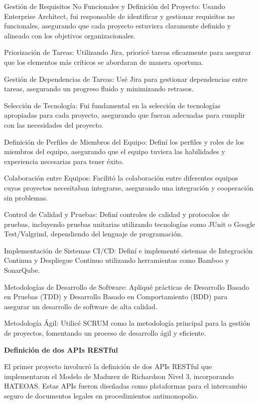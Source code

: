 \documentclass[a4paper,10pt]{article}
\newcommand{\cvsubsubsection}[1]{
\begin{tcolorbox}[colback=gray!10, colframe=gray!10, boxrule=0pt, arc=0mm, outer arc=0mm, width=\textwidth, boxsep=0pt, left=4mm, right=4mm, top=1mm, bottom=1mm]
  \textbf{#1}
\end{tcolorbox}
\vspace{1mm}
}
\begin{document}
Gestión de Requisitos No Funcionales y Definición del Proyecto: Usando Enterprise Architect, fui responsable de identificar y gestionar requisitos no funcionales, asegurando que cada proyecto estuviera claramente definido y alineado con los objetivos organizacionales.

Priorización de Tareas: Utilizando Jira, prioricé tareas eficazmente para asegurar que los elementos más críticos se abordaran de manera oportuna.

Gestión de Dependencias de Tareas: Usé Jira para gestionar dependencias entre tareas, asegurando un progreso fluido y minimizando retrasos.

Selección de Tecnología: Fui fundamental en la selección de tecnologías apropiadas para cada proyecto, asegurando que fueran adecuadas para cumplir con las necesidades del proyecto.

Definición de Perfiles de Miembros del Equipo: Definí los perfiles y roles de los miembros del equipo, asegurando que el equipo tuviera las habilidades y experiencia necesarias para tener éxito.

Colaboración entre Equipos: Facilitó la colaboración entre diferentes equipos cuyos proyectos necesitaban integrarse, asegurando una integración y cooperación sin problemas.

Control de Calidad y Pruebas: Definí controles de calidad y protocolos de pruebas, incluyendo pruebas unitarias utilizando tecnologías como JUnit o Google Test/Valgrind, dependiendo del lenguaje de programación.

Implementación de Sistemas CI/CD: Definí e implementé sistemas de Integración Continua y Despliegue Continuo utilizando herramientas como Bamboo y SonarQube.

Metodologías de Desarrollo de Software: Apliqué prácticas de Desarrollo Basado en Pruebas (TDD) y Desarrollo Basado en Comportamiento (BDD) para asegurar un desarrollo de software de alta calidad.

Metodología Ágil: Utilicé SCRUM como la metodología principal para la gestión de proyectos, fomentando un proceso de desarrollo ágil y eficiente.



\cvsubsubsection{Definición de dos APIs RESTful}
El primer proyecto involucró la definición de dos APIs RESTful que implementaron el Modelo de Madurez de Richardson Nivel 3, incorporando HATEOAS. Estas APIs fueron diseñadas como plataformas para el intercambio seguro de documentos legales en procedimientos antimonopolio.
\end{document}
